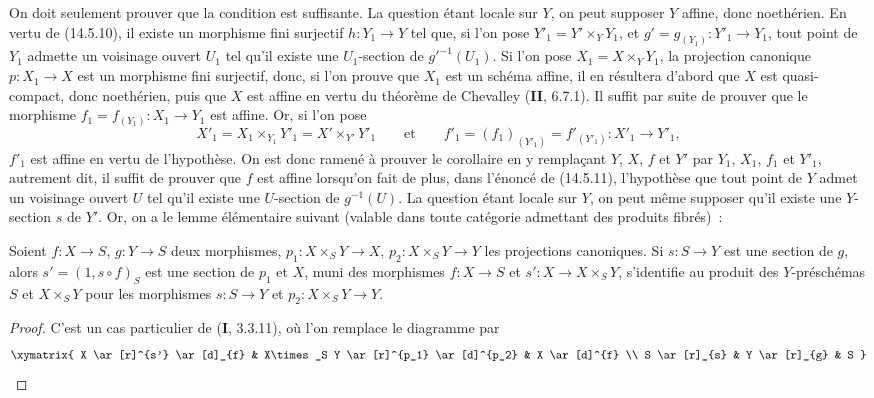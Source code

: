 On doit seulement prouver que la condition est suffisante. La question étant locale
sur $Y$, on peut supposer $Y$ affine, donc noethérien. En vertu de (14.5.10), il
existe un morphisme fini surjectif $h:Y_1\to Y$ tel que, si l'on pose
$Y'_1=Y'\times_Y Y_1$, et $g'=g_{(Y_1)}:Y'_1\to Y_1$, tout point de $Y_1$ admette
un voisinage ouvert $U_1$ tel qu'il existe une $U_1$-section de $g'^{-1}(U_1)$. Si
l'on pose $X_1=X\times_Y Y_1$, la projection canonique $p:X_1\to X$ est un
morphisme fini surjectif, donc, si l'on prouve que $X_1$ est un schéma affine, il en
résultera d'abord que $X$ est quasi-compact, donc noethérien, puis que $X$ est affine
en vertu du théorème de Chevalley (\textbf{II}, 6.7.1). Il suffit par suite de
prouver que le morphisme $f_1=f_{(Y_1)}:X_1\to Y_1$ est affine. Or, si l'on pose
\[
  X'_1=X_1\times_{Y_1}Y'_1=X'\times_{Y'}Y'_1
  \qquad\text{et}\qquad
  f'_1=(f_1)_{(Y'_1)}=f'_{(Y'_1)}:X'_1\to Y'_1,
\]
$f'_1$ est affine en vertu de l'hypothèse. On est donc ramené à prouver le corollaire
en y remplaçant $Y$, $X$, $f$ et $Y'$ par $Y_1$, $X_1$, $f_1$ et $Y'_1$,
autrement dit, il suffit de prouver que $f$ est affine lorsqu'on fait de plus, dans
l'énoncé de (14.5.11), l'hypothèse que tout point de $Y$ admet un voisinage ouvert
$U$ tel qu'il existe une $U$-section de $g^{-1}(U)$. La question étant locale sur
$Y$, on peut même supposer qu'il existe une $Y$-section $s$ de $Y'$. Or, on a le
lemme élémentaire suivant (valable dans toute catégorie admettant des produits
fibrés)~:

\begin{lemma}[14.5.11.1]
\label{IV.14.5.11.1-fr}
Soient $f:X\to S$, $g:Y\to S$ deux morphismes, $p_1:X\times_S Y\to X$,
$p_2:X\times_S Y\to Y$ les projections canoniques. Si $s:S\to Y$ est une section
de $g$, alors $s'=(1,s\circ f)_S$ est une section de $p_1$ et $X$, muni des
morphismes $f:X\to S$ et $s':X\to X\times_S Y$, s'identifie au produit des
$Y$-préschémas $S$ et $X\times_S Y$ pour les morphismes $s:S\to Y$ et
$p_2:X\times_S Y\to Y$.
\end{lemma}


\begin{proof}
C'est un cas particulier de (\textbf{I}, 3.3.11), où l'on remplace le diagramme par
\[
  \xymatrix{
    X \ar[r]^{s'} \ar[d]_{f} & X\times_S Y \ar[r]^{p_1} \ar[d]^{p_2} & X \ar[d]^{f} \\
    S \ar[r]_{s} & Y \ar[r]_{g} & S
  }
\]
\end{proof}

